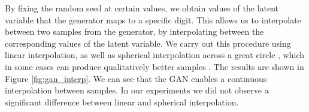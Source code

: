 \documentclass{article}
\begin{document}
By fixing the random seed at certain values, we obtain values of the latent variable that the generator maps to a specific digit. This allows us to interpolate between two samples from the generator, by interpolating between the corresponding values of the latent variable. We carry out this procedure using linear interpolation, as well as spherical interpolation across a great circle \cite{shoemake1985animating}, which in some cases can produce qualitatively better samples \cite{white2016sampling}. The results are shown in Figure \ref{fig:gan_interp}. We can see that the GAN enables a continuous interpolation between samples. In our experiments we did not observe a significant difference between linear and spherical interpolation.
























\end{document}
